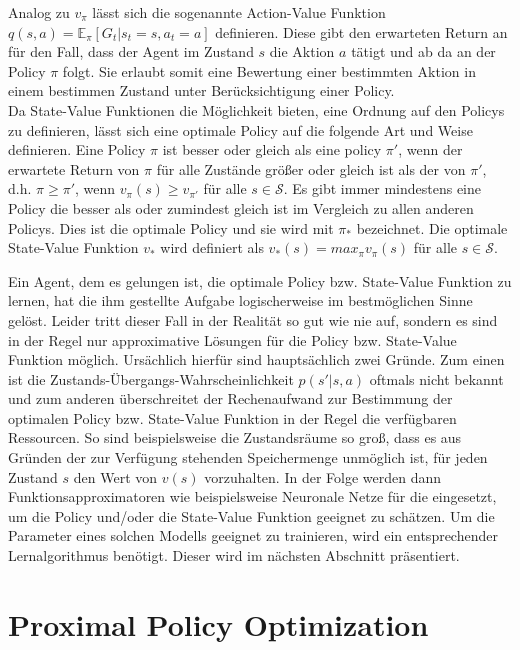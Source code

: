 Analog zu $v_\pi$ lässt sich die sogenannte Action-Value Funktion $q(s,a) = \mathbb{E}_\pi[G_t | s_t=s, a_t=a]$ definieren. Diese gibt den erwarteten Return an für den Fall, dass der Agent im Zustand $s$ die Aktion $a$ tätigt und ab da an der Policy $\pi$ folgt. Sie erlaubt somit eine Bewertung einer bestimmten Aktion in einem bestimmen Zustand unter Berücksichtigung einer Policy.\\

Da State-Value Funktionen die Möglichkeit bieten, eine Ordnung auf den Policys zu definieren, lässt sich eine optimale Policy auf die folgende Art und Weise definieren. Eine Policy $\pi$ ist besser oder gleich als eine policy $\pi'$, wenn der erwartete Return von $\pi$ für alle Zustände größer oder gleich ist als der von $\pi'$, d.h. $\pi \ge \pi'$, wenn $v_\pi(s) \ge v_{\pi'}$ für alle $s \in \mathcal{S}$. Es gibt immer mindestens eine Policy die besser als oder zumindest gleich ist im Vergleich zu allen anderen Policys. Dies ist die optimale Policy und sie wird mit $\pi_*$ bezeichnet. Die optimale State-Value Funktion $v_*$ wird definiert als $v_*(s) = max_\pi v_\pi(s)$ für alle $s \in \mathcal{S}$.

Ein Agent, dem es gelungen ist, die optimale Policy bzw. State-Value Funktion zu lernen, hat die ihm gestellte Aufgabe logischerweise im bestmöglichen Sinne gelöst. Leider tritt dieser Fall in der Realität so gut wie nie auf, sondern es sind in der Regel nur approximative Lösungen für die Policy bzw. State-Value Funktion möglich. Ursächlich hierfür sind hauptsächlich zwei Gründe. Zum einen ist die Zustands-Übergangs-Wahrscheinlichkeit $p(s'|s,a)$ oftmals nicht bekannt und zum anderen überschreitet der Rechenaufwand zur Bestimmung der optimalen Policy bzw. State-Value Funktion in der Regel die verfügbaren Ressourcen. So sind beispielsweise die Zustandsräume so groß, dass es aus Gründen der zur Verfügung stehenden Speichermenge unmöglich ist, für jeden Zustand $s$ den Wert von $v(s)$ vorzuhalten. In der Folge werden dann Funktionsapproximatoren wie beispielsweise Neuronale Netze für die eingesetzt, um die Policy und/oder die State-Value Funktion geeignet zu schätzen. Um die Parameter eines solchen Modells geeignet zu trainieren, wird ein entsprechender Lernalgorithmus benötigt. Dieser wird im nächsten Abschnitt präsentiert.


\section{Proximal Policy Optimization}
\label{sec_ppo}

